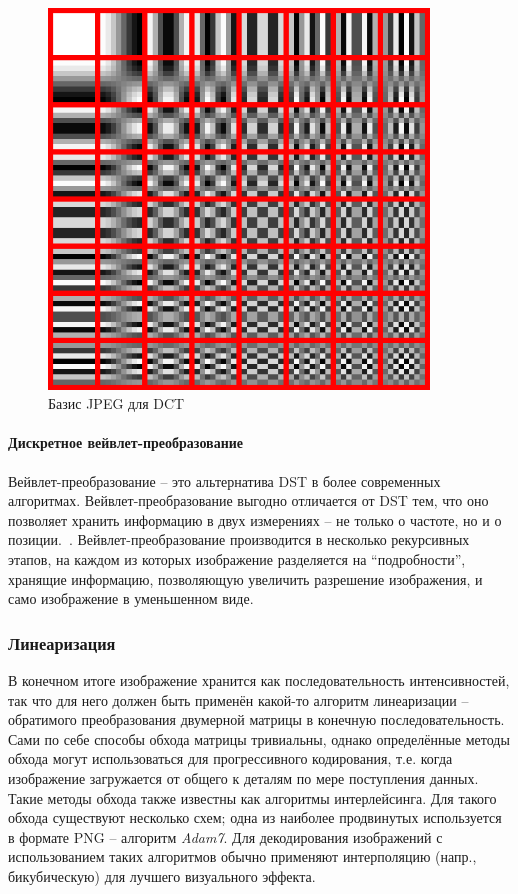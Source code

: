 \documentclass[a4paper,12pt]{article}
\numberwithin{equation}{section}
\begin{document}
\begin{figure}
  \centering
  \includegraphics[width=0.9\textwidth]{img/dctjpeg}
  \caption{Базис JPEG для DCT}
  \label{fig:jpegbas}
\end{figure}

\paragraph{Дискретное вейвлет-преобразование}
Вейвлет-преобразование -- это альтернатива DST в более современных
алгоритмах. Вейвлет-преобразование выгодно отличается от DST тем, что оно
позволяет хранить информацию в двух измерениях -- не только о частоте, но и о
позиции.~\cite{jour:wavelets}. Вейвлет-преобразование производится в несколько
рекурсивных этапов, на каждом из которых изображение разделяется на
``подробности'', хранящие информацию, позволяющую увеличить разрешение
изображения, и само изображение в уменьшенном виде.

\subsubsection{Линеаризация}

В конечном итоге изображение хранится как последовательность интенсивностей, так
что для него должен быть применён какой-то алгоритм линеаризации --
обратимого преобразования двумерной матрицы в конечную последовательность. Сами
по себе способы обхода матрицы тривиальны, однако определённые методы обхода
могут использоваться для прогрессивного кодирования, т.е. когда изображение
загружается от общего к деталям по мере поступления данных. Такие методы обхода
также известны как алгоритмы интерлейсинга. Для такого обхода существуют
несколько схем; одна из наиболее продвинутых используется в формате PNG --
алгоритм \emph{Adam7}. Для декодирования изображений с использованием таких
алгоритмов обычно применяют интерполяцию (напр., бикубическую) для лучшего
визуального эффекта.
\end{document}
